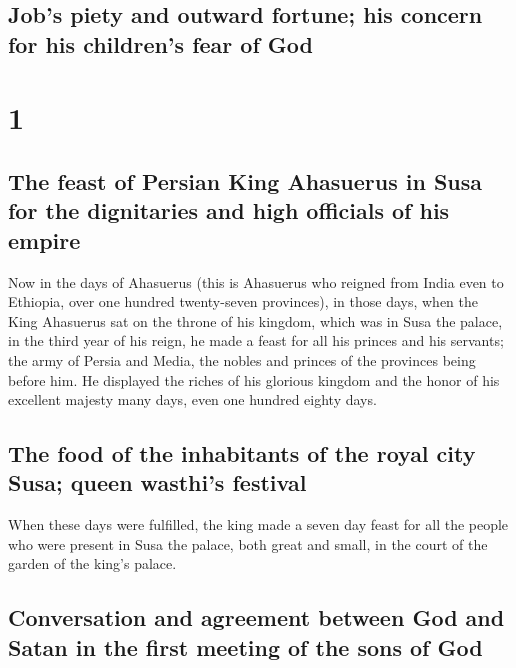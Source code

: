 \hypertarget{jobs-piety-and-outward-fortune-his-concern-for-his-childrens-fear-of-god}{%
\subsection{Job's piety and outward fortune; his concern for his
children's fear of
God}\label{jobs-piety-and-outward-fortune-his-concern-for-his-childrens-fear-of-god}}

\hypertarget{section}{%
\section{1}\label{section}}

\hypertarget{the-feast-of-persian-king-ahasuerus-in-susa-for-the-dignitaries-and-high-officials-of-his-empire}{%
\subsection{The feast of Persian King Ahasuerus in Susa for the
dignitaries and high officials of his
empire}\label{the-feast-of-persian-king-ahasuerus-in-susa-for-the-dignitaries-and-high-officials-of-his-empire}}

 Now in the days of Ahasuerus (this is Ahasuerus who
reigned from India even to Ethiopia, over one hundred twenty-seven
provinces),  in those days, when the King Ahasuerus sat on
the throne of his kingdom, which was in Susa the palace, 
in the third year of his reign, he made a feast for all his princes and
his servants; the army of Persia and Media, the nobles and princes of
the provinces being before him.  He displayed the riches
of his glorious kingdom and the honor of his excellent majesty many
days, even one hundred eighty days.

\hypertarget{the-food-of-the-inhabitants-of-the-royal-city-susa-queen-wasthis-festival}{%
\subsection{The food of the inhabitants of the royal city Susa; queen
wasthi's
festival}\label{the-food-of-the-inhabitants-of-the-royal-city-susa-queen-wasthis-festival}}

 When these days were fulfilled, the king made a seven day
feast for all the people who were present in Susa the palace, both great
and small, in the court of the garden of the king's palace.

\hypertarget{conversation-and-agreement-between-god-and-satan-in-the-first-meeting-of-the-sons-of-god}{%
\subsection{Conversation and agreement between God and Satan in the
first meeting of the sons of
God}\label{conversation-and-agreement-between-god-and-satan-in-the-first-meeting-of-the-sons-of-god}}

